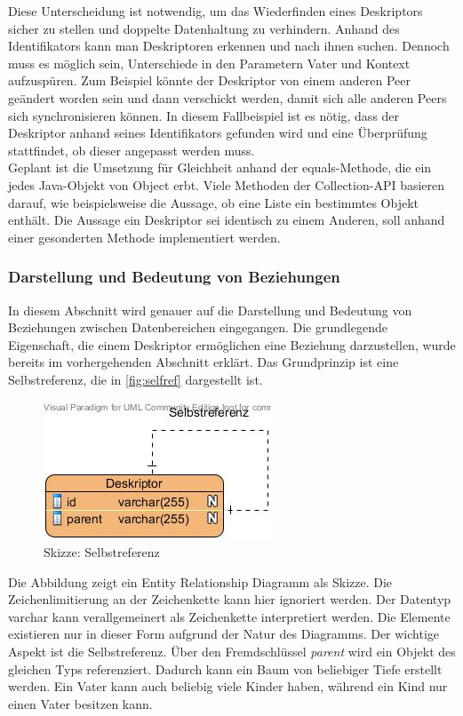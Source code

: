 \documentclass[a4paper]{article}
\begin{document}
	Diese Unterscheidung ist notwendig, um das Wiederfinden eines Deskriptors
	sicher zu stellen und doppelte Datenhaltung zu verhindern.
	Anhand des Identifikators kann man Deskriptoren erkennen und nach ihnen suchen. 
	Dennoch muss es möglich sein, Unterschiede in den Parametern 
	Vater und Kontext aufzuspüren. Zum Beispiel könnte
	der Deskriptor von einem anderen Peer geändert worden sein und dann
	verschickt werden, damit sich alle anderen Peers sich synchronisieren können. 
	In diesem
	Fallbeispiel ist es nötig, dass der Deskriptor anhand seines Identifikators
	gefunden wird und eine Überprüfung stattfindet, ob dieser angepasst werden
	muss. \\
	
	Geplant ist die Umsetzung für Gleichheit anhand der equals-Methode, die ein
	jedes Java-Objekt von Object erbt. Viele Methoden der Collection-API basieren
	darauf, wie beispielsweise die Aussage, ob eine Liste ein bestimmtes Objekt
	enthält. Die Aussage ein Deskriptor sei identisch zu einem Anderen, soll anhand
	einer gesonderten Methode implementiert werden.
	
	\subsubsection{Darstellung und Bedeutung von Beziehungen}
	
	In diesem Abschnitt wird genauer auf die Darstellung und Bedeutung von 
	Beziehungen zwischen Datenbereichen eingegangen. Die grundlegende
	Eigenschaft, die einem Deskriptor ermöglichen eine Beziehung darzustellen,
	wurde bereits im vorhergehenden Abschnitt erklärt. Das Grundprinzip ist eine
	Selbstreferenz, die in \autoref{fig:selfref} dargestellt ist.
	
	\begin{figure}[H] 
		\centerline{
			\includegraphics[scale=1]{../Bilder/selfref.jpg}
		}
		\caption{Skizze: Selbstreferenz}
		\label{fig:selfref}
	\end{figure}
	
	Die Abbildung zeigt ein Entity Relationship Diagramm als Skizze. Die 
	Zeichenlimitierung an der Zeichenkette kann hier ignoriert werden. Der Datentyp 	
	varchar kann verallgemeinert als Zeichenkette interpretiert werden. Die
	Elemente existieren nur in dieser Form aufgrund der Natur des Diagramms.
	Der wichtige Aspekt ist die Selbstreferenz. Über den Fremdschlüssel
	\emph{parent} wird ein Objekt des gleichen Typs referenziert. Dadurch kann
	ein Baum von beliebiger Tiefe erstellt werden. Ein Vater kann 
	auch beliebig viele Kinder haben, während ein Kind nur einen Vater besitzen
	kann. \\
	
\end{document}
